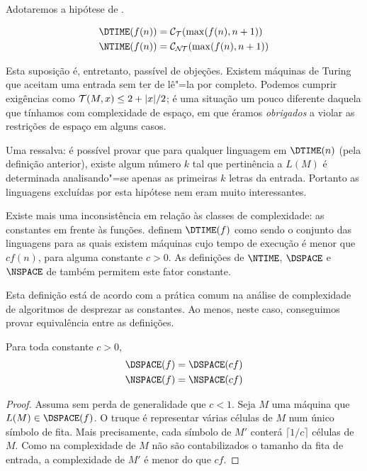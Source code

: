 Adotaremos a hipótese de .
\begin{definition}
    \begin{align*}
        \DTIME(f(n)) &= \mathcal C_\PhiDT(\max(f(n), n+1)) \\
        \NTIME(f(n)) &= \mathcal C_\PhiNT(\max(f(n), n+1))
    \end{align*}
\end{definition}

Esta suposição é,
entretanto,
passível de objeções.
Existem máquinas de Turing
que aceitam uma entrada
sem ter de lê"=la por completo.
Podemos cumprir exigências como
${\mathcal{T}}(M, x) \leq 2 + |x|/2$;
é uma situação um pouco diferente
daquela que tínhamos com complexidade de espaço,
em que éramos \emph{obrigados}
a violar as restrições de espaço
em alguns casos.

Uma ressalva:
é possível provar que
para qualquer linguagem em $\DTIME(n)$
(pela definição anterior),
existe algum número $k$ tal que
pertinência a $L(M)$
é determinada analisando"=se
apenas as primeiras $k$ letras da entrada.
Portanto as linguagens excluídas por esta hipótese
nem eram muito interessantes.

Existe mais uma inconsistência
em relação às classes de complexidade:
as constantes em frente às funções.
definem $\DTIME(f)$ como sendo o conjunto das linguagens
para as quais existem máquinas cujo tempo de execução
é menor que $c f(n)$, para alguma constante $c > 0$.
As definições de $\NTIME$, $\DSPACE$ e $\NSPACE$
de 
também permitem este fator constante.

Esta definição está de acordo com
a prática comum na análise de complexidade de algoritmos
de desprezar as constantes.
Ao menos,
neste caso,
conseguimos provar equivalência entre as definições.

\begin{theorem}
    Para toda constante $c > 0$,
    \begin{align*}
        \DSPACE(f) & = \DSPACE(cf) \\
        \NSPACE(f) & = \NSPACE(cf)
    \end{align*}
\end{theorem}

\begin{proof}
    Assuma sem perda de generalidade que $c < 1$.
    Seja $M$ uma máquina que $L(M) \in \DSPACE(f)$.
    O truque é representar várias células de $M$
    num único símbolo de fita.
    Mais precisamente,
    cada símbolo de $M'$ conterá
    $\lceil 1/c \rceil$ células de $M$.
    Como na complexidade de $M$
    não são contabilizados o tamanho da fita de entrada,
    a complexidade de $M'$ é menor do que $cf$.
\end{proof}

